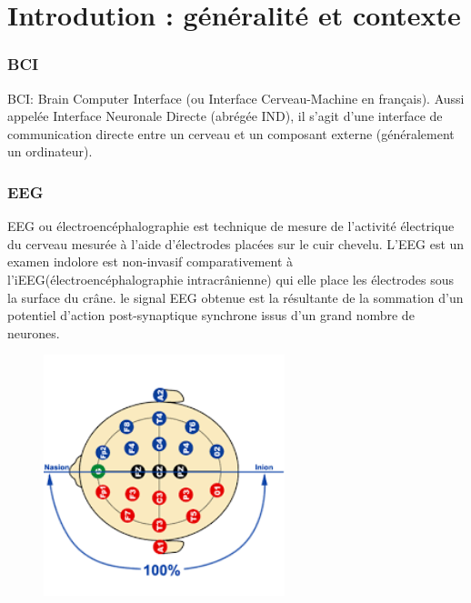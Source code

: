 \part{Introdution : généralité et contexte} %
\label{prt:introduction_ _théorique_}
	
	\section{BCI} %
	\label{sec:intro_bci}
	
	BCI: Brain Computer Interface (ou Interface Cerveau-Machine en français).
	Aussi appelée Interface Neuronale Directe (abrégée IND), il s'agit d'une interface de communication directe entre un cerveau et un composant externe (généralement un ordinateur).

	
	\section{EEG} %
	\label{sec:eeg}
	EEG ou électroencéphalographie est technique de mesure de l'activité électrique du cerveau mesurée à l'aide d'électrodes placées sur le cuir chevelu. L'EEG est un examen indolore est non-invasif comparativement à l'iEEG(électroencéphalographie intracrânienne) qui elle place les électrodes sous la surface du crâne. le signal EEG obtenue est la résultante de la sommation d'un potentiel d'action post-synaptique synchrone issus d'un grand nombre de neurones.
	\begin{figure}
		\centering 
	 	\includegraphics [width=7cm,height=7cm]{figures/captoreeg.png} \\
		\label{fig_captors}	
	\end{figure}

	

